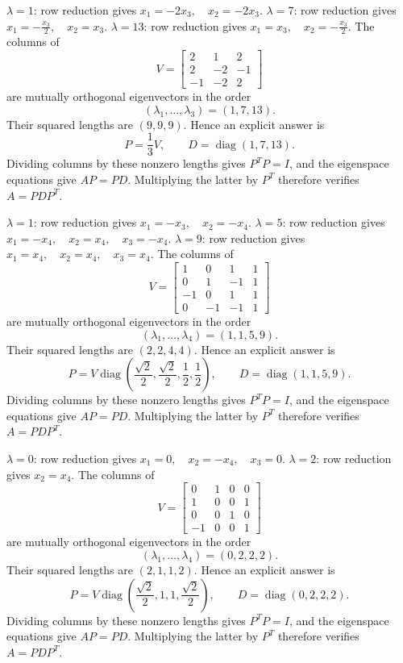 $\lambda=1$: row reduction gives \(x_{1}=- 2 x_{3},\quad x_{2}=- 2 x_{3}\).
$\lambda=7$: row reduction gives \(x_{1}=- \frac{x_{3}}{2},\quad x_{2}=x_{3}\).
$\lambda=13$: row reduction gives \(x_{1}=x_{3},\quad x_{2}=- \frac{x_{3}}{2}\).
The columns of
\[
 V=\begin{bmatrix}2&1&2\\2&-2&-1\\-1&-2&2\end{bmatrix}
\]
are mutually orthogonal eigenvectors in the order
\[
 (\lambda_1,\ldots,\lambda_3)=(1,7,13).
\]
Their squared lengths are $(9,9,9)$. Hence an explicit answer is
\[
 P=\frac1{3}V,\qquad
 D=\operatorname{diag}(1,7,13).
\]
Dividing columns by these nonzero lengths gives $P^TP=I$, and the
eigenspace equations give $AP=PD$. Multiplying the latter by $P^T$
therefore verifies $A=PDP^T$.

$\lambda=1$: row reduction gives \(x_{1}=- x_{3},\quad x_{2}=- x_{4}\).
$\lambda=5$: row reduction gives \(x_{1}=- x_{4},\quad x_{2}=x_{4},\quad x_{3}=- x_{4}\).
$\lambda=9$: row reduction gives \(x_{1}=x_{4},\quad x_{2}=x_{4},\quad x_{3}=x_{4}\).
The columns of
\[
 V=\begin{bmatrix}1&0&1&1\\0&1&-1&1\\-1&0&1&1\\0&-1&-1&1\end{bmatrix}
\]
are mutually orthogonal eigenvectors in the order
\[
 (\lambda_1,\ldots,\lambda_4)=(1,1,5,9).
\]
Their squared lengths are $(2,2,4,4)$. Hence an explicit answer is
\[
 P=V\operatorname{diag}(\frac{\sqrt{2}}{2},\frac{\sqrt{2}}{2},\frac{1}{2},\frac{1}{2}),\qquad
 D=\operatorname{diag}(1,1,5,9).
\]
Dividing columns by these nonzero lengths gives $P^TP=I$, and the
eigenspace equations give $AP=PD$. Multiplying the latter by $P^T$
therefore verifies $A=PDP^T$.

$\lambda=0$: row reduction gives \(x_{1}=0,\quad x_{2}=- x_{4},\quad x_{3}=0\).
$\lambda=2$: row reduction gives \(x_{2}=x_{4}\).
The columns of
\[
 V=\begin{bmatrix}0&1&0&0\\1&0&0&1\\0&0&1&0\\-1&0&0&1\end{bmatrix}
\]
are mutually orthogonal eigenvectors in the order
\[
 (\lambda_1,\ldots,\lambda_4)=(0,2,2,2).
\]
Their squared lengths are $(2,1,1,2)$. Hence an explicit answer is
\[
 P=V\operatorname{diag}(\frac{\sqrt{2}}{2},1,1,\frac{\sqrt{2}}{2}),\qquad
 D=\operatorname{diag}(0,2,2,2).
\]
Dividing columns by these nonzero lengths gives $P^TP=I$, and the
eigenspace equations give $AP=PD$. Multiplying the latter by $P^T$
therefore verifies $A=PDP^T$.

